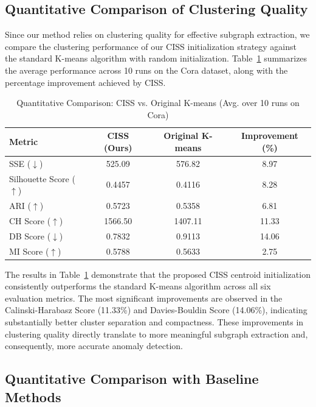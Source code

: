 \subsection{Quantitative Comparison of Clustering Quality}

Since our method relies on clustering quality for effective subgraph extraction, we compare the clustering performance of our CISS initialization strategy against the standard K-means algorithm with random initialization. Table~\ref{tab:quantitative_comparison} summarizes the average performance across 10 runs on the Cora dataset, along with the percentage improvement achieved by CISS.

\begin{table}[ht]
\centering
\caption{Quantitative Comparison: CISS vs. Original K-means (Avg. over 10 runs on Cora)}
\label{tab:quantitative_comparison}
\begin{tabular}{|l|c|c|c|}
\hline
\textbf{Metric} & \textbf{CISS (Ours)} & \textbf{Original K-means} & \textbf{Improvement (\%)} \\
\hline
SSE ($\downarrow$) & 525.09 & 576.82 & 8.97 \\
\hline
Silhouette Score ($\uparrow$) & 0.4457 & 0.4116 & 8.28 \\
\hline
ARI ($\uparrow$) & 0.5723 & 0.5358 & 6.81 \\
\hline
CH Score ($\uparrow$) & 1566.50 & 1407.11 & 11.33 \\
\hline
DB Score ($\downarrow$) & 0.7832 & 0.9113 & 14.06 \\
\hline
MI Score ($\uparrow$) & 0.5788 & 0.5633 & 2.75 \\
\hline
\end{tabular}
\end{table}

The results in Table~\ref{tab:quantitative_comparison} demonstrate that the proposed CISS centroid initialization consistently outperforms the standard K-means algorithm across all six evaluation metrics. The most significant improvements are observed in the Calinski-Harabasz Score (11.33\%) and Davies-Bouldin Score (14.06\%), indicating substantially better cluster separation and compactness. These improvements in clustering quality directly translate to more meaningful subgraph extraction and, consequently, more accurate anomaly detection.

\subsection{Quantitative Comparison with Baseline Methods}

